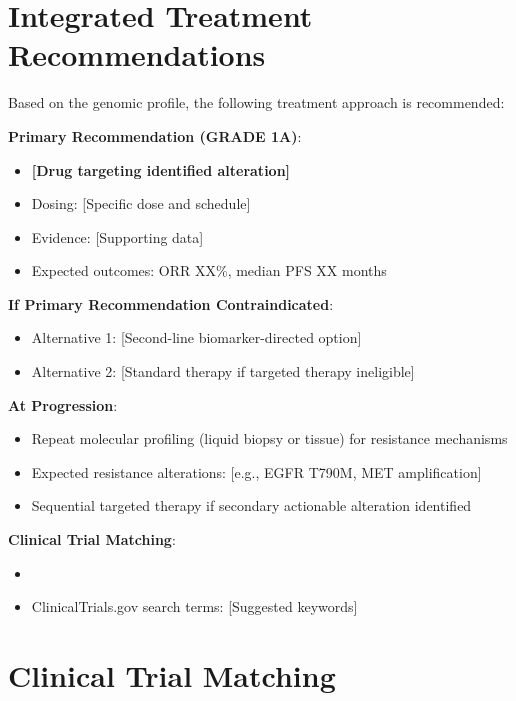 \documentclass[10pt,letterpaper]{article}
\begin{document}
\section{Integrated Treatment Recommendations}

\begin{tcolorbox}[enhanced,colback=stronggreen!10,colframe=tier1green,
title=\textbf{PERSONALIZED TREATMENT PLAN},fonttitle=\bfseries,coltitle=black]
{\small
Based on the genomic profile, the following treatment approach is recommended:

\textbf{Primary Recommendation (GRADE 1A)}:
\begin{itemize}
\item \textbf{[Drug targeting identified alteration]}
\item Dosing: [Specific dose and schedule]
\item Evidence: [Supporting data]
\item Expected outcomes: ORR XX\%, median PFS XX months
\end{itemize}

\textbf{If Primary Recommendation Contraindicated}:
\begin{itemize}
\item Alternative 1: [Second-line biomarker-directed option]
\item Alternative 2: [Standard therapy if targeted therapy ineligible]
\end{itemize}

\textbf{At Progression}:
\begin{itemize}
\item Repeat molecular profiling (liquid biopsy or tissue) for resistance mechanisms
\item Expected resistance alterations: [e.g., EGFR T790M, MET amplification]
\item Sequential targeted therapy if secondary actionable alteration identified
\end{itemize}

\textbf{Clinical Trial Matching}:
\begin{itemize}
\item [List relevant trials based on identified alterations]
\item ClinicalTrials.gov search terms: [Suggested keywords]
\end{itemize}
}
\end{tcolorbox}

\section{Clinical Trial Matching}
\end{document}
